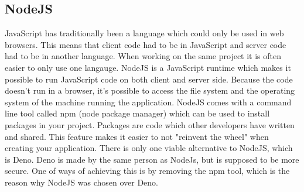 \subsection{NodeJS}
JavaScript has traditionally been a language which could only be used in web browsers. This means that client code had to be in JavaScript and server code had to be in another language. When working on the same project it is often easier to only use one langauge. NodeJS is a JavaScript runtime which makes it possible to run JavaScript code on both client and server side. Because the code doesn't run in a browser, it's possible to access the file system and the operating system of the machine running the application. NodeJS comes with a command line tool called npm (node package manager) which can be used to install packages in your project. Packages are code which other developers have written and shared. This feature makes it easier to not "reinvent the wheel" when creating your application. There is only one viable alternative to NodeJS, which is Deno. Deno is made by the same person as NodeJs, but is supposed to be more secure. One of ways of achieving this is by removing the npm tool, which is the reason why NodeJS was chosen over Deno.